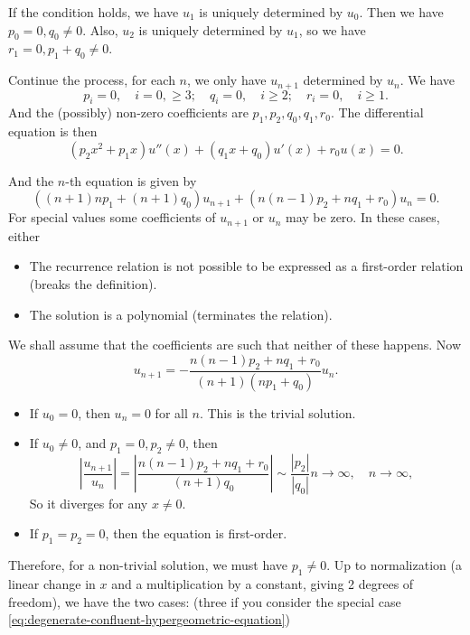 \documentclass[../main.tex]{subfiles}
\begin{document}
If the condition holds, we have $u_1$ is uniquely determined by $u_0$. Then we have $p_0=0, q_0 \neq 0$. Also, $u_2$ is uniquely determined by $u_1$, so we have $r_1=0, p_1 + q_0 \neq 0$.

Continue the process, for each $n$, we only have $u_{n+1}$ determined by $u_n$. We have
\begin{equation}
	p_i=0, \quad i = 0, \geq 3; \quad q_i=0, \quad i \geq 2; \quad r_i=0, \quad i \geq 1.
\end{equation}
And the (possibly) non-zero coefficients are $p_1, p_2, q_0, q_1, r_0$. The differential equation is then
\begin{equation}
	(p_2 x^2 + p_1 x) u''(x) + (q_1 x + q_0) u'(x) + r_0 u(x) = 0.
\end{equation}

And the $n$-th equation is given by
\begin{equation}
	((n+1)n p_1 + (n+1) q_0) u_{n+1} + (n(n-1) p_2 + n q_1 + r_0) u_n = 0.
\end{equation}
For special values some coefficients of $u_{n+1}$ or $u_n$ may be zero. In these cases, either
\begin{itemize}
	\item The recurrence relation is not possible to be expressed as a first-order relation (breaks the definition).
	\item The solution is a polynomial (terminates the relation).
\end{itemize}
We shall assume that the coefficients are such that neither of these happens. Now
\begin{equation}
	u_{n+1} = -\frac{n(n-1) p_2 + n q_1 + r_0}{(n+1)(n p_1 + q_0)} u_n.
\end{equation}
\begin{itemize}
	\item If $u_0=0$, then $u_n=0$ for all $n$. This is the trivial solution.
	\item If $u_0 \neq 0$, and $p_1=0, p_2 \neq 0$, then
		\begin{equation*}
			\left|\frac{u_{n+1}}{u_n}\right| = \left|\frac{n(n-1) p_2 + n q_1 + r_0}{(n+1) q_0}\right| \sim \frac{|p_2|}{|q_0|} n \rightarrow \infty , \quad n \to \infty,
		\end{equation*}
		So it diverges for any $x \neq 0$.
	\item If $p_1=p_2=0$, then the equation is first-order.
\end{itemize}
Therefore, for a non-trivial solution, we must have $p_1 \neq 0$. Up to normalization (a linear change in $x$ and a multiplication by a constant, giving 2 degrees of freedom), we have the two cases: (three if you consider the special case \ref{eq:degenerate-confluent-hypergeometric-equation})
\end{document}
